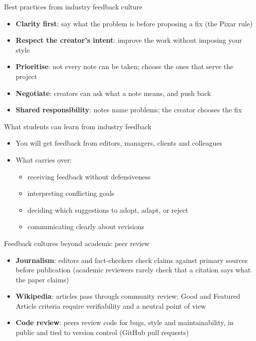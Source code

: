 \documentclass[aspectratio=169]{beamer}
\begin{document}
\begin{frame}{Best practices from industry feedback culture}
\begin{itemize}
  \item \textbf{Clarity first}: say what the problem is before proposing a fix (the Pixar rule)
  \item \textbf{Respect the creator's intent}: improve the work without imposing your style
  \item \textbf{Prioritise}: not every note can be taken; choose the ones that serve the project
  \item \textbf{Negotiate}: creators can ask what a note means, and push back
  \item \textbf{Shared responsibility}: notes name problems; the creator chooses the fix
\end{itemize}

\end{frame}

\begin{frame}{What students can learn from industry feedback}
\begin{itemize}
  \item You will get feedback from editors, managers, clients and colleagues
  \item What carries over:
    \begin{itemize}
      \item receiving feedback without defensiveness
      \item interpreting conflicting goals
      \item deciding which suggestions to adopt, adapt, or reject
      \item communicating clearly about revisions
    \end{itemize}
\end{itemize}
\end{frame}



\begin{frame}{Feedback cultures beyond academic peer review}
\begin{itemize}
  \item \textbf{Journalism}: editors and fact-checkers check claims against primary sources before publication (academic reviewers rarely check that a citation says what the paper claims)
  \item \textbf{Wikipedia}: articles pass through community review; Good and Featured Article criteria require verifiability and a neutral point of view
  \item \textbf{Code review}: peers review code for bugs, style and maintainability, in public and tied to version control (GitHub pull requests)
  \end{itemize}
\end{frame}
\end{document}

